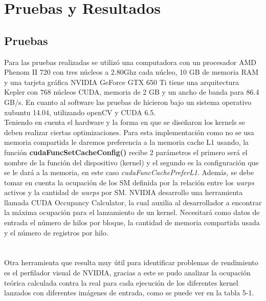\chapter{Pruebas y Resultados}
\section{Pruebas}
Para las pruebas realizadas se utilizó una computadora con un procesador AMD Phenom II 720 con tres núcleos a 2.80Ghz cada núcleo, 10 GB de memoria RAM y una tarjeta gráfica NVIDIA GeForce GTX 650 Ti tiene una arquitectura Kepler con 768 núcleos CUDA, memoria de 2 GB y un ancho de banda para 86.4 GB/s. En cuanto al software las pruebas de hicieron bajo un sistema operativo xubuntu 14.04, utilizando openCV y CUDA 6.5.\\
Teniendo en cuenta el hardware y la forma en que se diseñaron los kernels se deben realizar ciertas optimizaciones. Para esta implementación como no se usa memoria compartida le daremos preferencia a la memoria cache L1 usando, la función \textbf{cudaFuncSetCacheConfig()} recibe 2 parámetros el primero será el nombre de la función del dispositivo (kernel) y el segundo es la configuración que se le dará a la memoria, en este caso \textit{cudaFuncCachePreferL1}. Además, se debe tomar en cuenta la ocupación de los SM definida por la relación entre los \textit{warps} activos y la cantidad de \textit{warps} por SM. NVIDIA desarrollo una herramienta llamada CUDA Occupancy Calculator\cite{calc}, la cual auxilia al desarrollador a encontrar la máxima ocupación para el lanzamiento de un kernel. Necesitará como datos de entrada el número de hilos por bloque, la cantidad de memoria compartida usada y el número de registros por hilo.\\\\\\
Otra herramienta que resulta muy útil para identificar problemas de rendimiento es el perfilador visual de NVIDIA\cite{profile}, gracias a este se pudo analizar la ocupación teórica calculada contra la real para cada ejecución de los diferentes kernel lanzados con diferentes imágenes de entrada, como se puede ver en la tabla 5-1.\\
